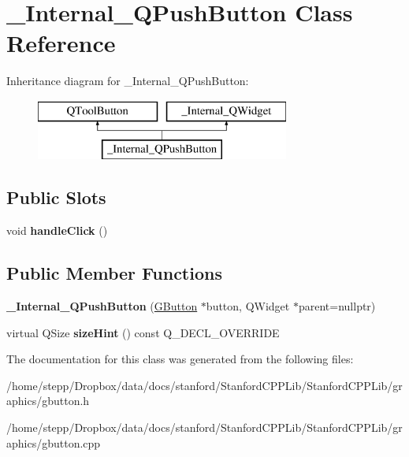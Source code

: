 \hypertarget{class__Internal__QPushButton}{}\section{\+\_\+\+Internal\+\_\+\+Q\+Push\+Button Class Reference}
\label{class__Internal__QPushButton}
Inheritance diagram for \+\_\+\+Internal\+\_\+\+Q\+Push\+Button\+:\begin{figure}[H]
\begin{center}
\leavevmode
\includegraphics[height=2.000000cm]{class__Internal__QPushButton}
\end{center}
\end{figure}
\subsection*{Public Slots}
\begin{DoxyCompactItemize}
\item 
\mbox{\label{class__Internal__QPushButton_a964687e230447bef280b3b3c5e9a6369}} 
void {\bfseries handle\+Click} ()
\end{DoxyCompactItemize}
\subsection*{Public Member Functions}
\begin{DoxyCompactItemize}
\item 
\mbox{\label{class__Internal__QPushButton_a881aedb69e3aab86a3898bbc0bbace69}} 
{\bfseries \+\_\+\+Internal\+\_\+\+Q\+Push\+Button} (\mbox{\hyperlink{classGButton}{G\+Button}} $\ast$button, Q\+Widget $\ast$parent=nullptr)
\item 
\mbox{\label{class__Internal__QPushButton_a761fd7e6e0dc774405abe9a69dae6eaa}} 
virtual Q\+Size {\bfseries size\+Hint} () const Q\+\_\+\+D\+E\+C\+L\+\_\+\+O\+V\+E\+R\+R\+I\+DE
\end{DoxyCompactItemize}


The documentation for this class was generated from the following files\+:\begin{DoxyCompactItemize}
\item 
/home/stepp/\+Dropbox/data/docs/stanford/\+Stanford\+C\+P\+P\+Lib/\+Stanford\+C\+P\+P\+Lib/graphics/gbutton.\+h\item 
/home/stepp/\+Dropbox/data/docs/stanford/\+Stanford\+C\+P\+P\+Lib/\+Stanford\+C\+P\+P\+Lib/graphics/gbutton.\+cpp\end{DoxyCompactItemize}
